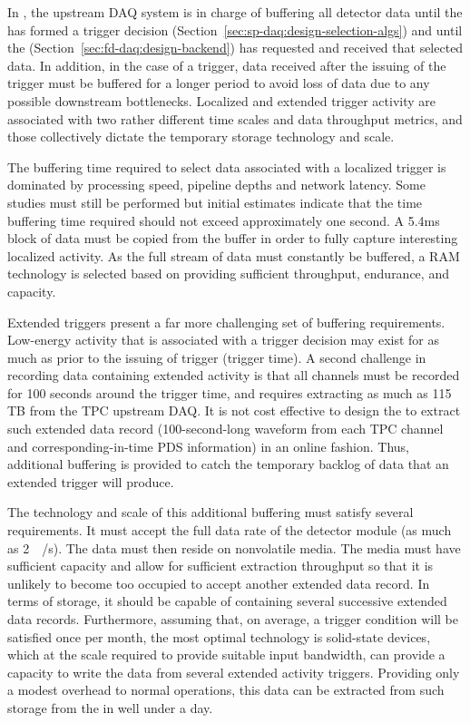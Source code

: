 In , the upstream DAQ system is in charge of buffering all
detector data until the  has formed a trigger decision
(Section~\ref{sec:sp-daq:design-selection-algs}) and until the
 (Section~\ref{sec:fd-daq:design-backend}) has requested and received that selected data. 
In addition, in the case of a  trigger, data received after
the issuing of the trigger must be buffered for a longer period to
avoid loss of data due to any possible downstream
bottlenecks. Localized and extended trigger activity are associated
with two rather different time scales and data throughput metrics, and
those collectively dictate the temporary storage technology and scale. 

The buffering time required to select data associated with a localized
trigger is dominated by processing speed, pipeline depths and network latency. Some studies must still be performed but initial estimates indicate that the time buffering time required should not exceed approximately one second. 
A  5.4\si{\milli\second} block of data must be copied from the buffer
in order to fully capture interesting localized activity. As the full stream of data must constantly be buffered, a RAM
technology is selected based on providing sufficient throughput,
endurance, and capacity. 

Extended triggers present a far more challenging set of buffering requirements.  
Low-energy activity that is associated with a  trigger
decision may exist for as much as \snbpretime prior to the issuing of 
trigger (trigger time).
A second challenge in recording data containing extended activity is
that all channels must be recorded for 100 seconds around the trigger
time, and requires extracting as much as 115 TB from the TPC upstream DAQ.
It is not cost effective to design the  to extract such
extended data record (100-second-long waveform from each TPC channel
and corresponding-in-time PDS information) in an online fashion. Thus, additional buffering is provided to catch
the temporary backlog of data that an extended trigger will produce.

The technology and scale of this additional buffering must satisfy several requirements. 
It must accept the full data rate of the detector module (as much as \SI{2}{\tera\byte/\second}). 
The data must then reside on nonvolatile media. 
The media must have sufficient capacity and allow for sufficient
extraction throughput so that it is unlikely 
to become too occupied to accept another extended data record. In
terms of storage, it should be capable of containing 
several successive extended data records.
Furthermore, assuming that, on average, a  trigger condition will be
satisfied once per month, the most optimal technology is %
solid-state devices, which at the scale required to provide suitable input bandwidth, can provide a capacity to write the data from several extended activity triggers.
Providing only a modest overhead to normal operations, this data can
be extracted from such storage from the  in well under a day.

